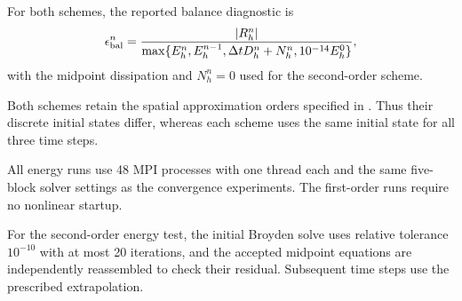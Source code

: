For both schemes, the reported balance diagnostic is
\[
\epsilon_{\rm bal}^n=
\frac{|R_h^n|}{\max\{E_h^n,E_h^{n-1},\Delta t D_h^n+N_h^n,
10^{-14}E_h^0\}},
\]
with the midpoint dissipation and $N_h^n=0$ used for the
second-order scheme.

Both schemes retain the spatial approximation orders specified in
. Thus their discrete initial states differ,
whereas each scheme uses the same initial state for all three time steps.

All energy runs use 48 MPI processes with one thread each and the
same five-block solver settings as the convergence experiments.
The first-order runs require no nonlinear startup.

For the second-order energy test, the initial Broyden solve uses relative tolerance
$10^{-10}$ with at most 20 iterations, and the accepted midpoint
equations are independently reassembled to check their residual.
Subsequent time steps use the prescribed extrapolation.
